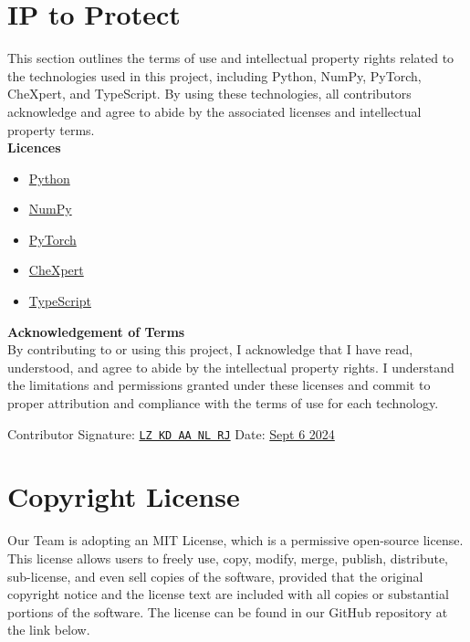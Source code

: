 \documentclass{article}
\begin{document}
\section{IP to Protect}

This section outlines the terms of use and intellectual property rights related to the technologies used in this project, including Python, NumPy, PyTorch, CheXpert, and TypeScript. By using these technologies, all contributors acknowledge and agree to abide by the associated licenses and intellectual property terms.\\
\textbf{Licences}
\begin{itemize}
    \item \href{https://docs.python.org/3/license.html#psf-license}{Python}
    \item \href{https://numpy.org/terms/#:~:text=These%20Terms%20of%20Use%20constitute,mobile%20website%20or%20mobile%20application}{NumPy}
    \item \href{https://discuss.pytorch.org/tos}{PyTorch}
    \item \href{https://www.stanford.edu/site/terms/}{CheXpert}
    \item \href{https://www.typescriptlang.org/License.html}{TypeScript}
\end{itemize}
\textbf{Acknowledgement of Terms}\\
By contributing to or using this project, I acknowledge that I have read, understood, and agree to abide by the intellectual property rights. I understand the limitations and permissions granted under these licenses and commit to proper attribution and compliance with the terms of use for each technology.

\vspace{1em} %

\noindent
Contributor Signature: \underline{\texttt{LZ KD AA NL RJ}} \hspace{4cm} Date: \underline{Sept 6 2024}

\section{Copyright License}

Our Team is adopting an MIT License, which is a permissive open-source license. This license  allows users to freely use, copy, modify, merge, publish, distribute, sub-license, and even sell copies of the software, provided that the original copyright notice and the license text are included with all copies or substantial portions of the software. The license can be found in our GitHub repository at the link below.
\end{document}
